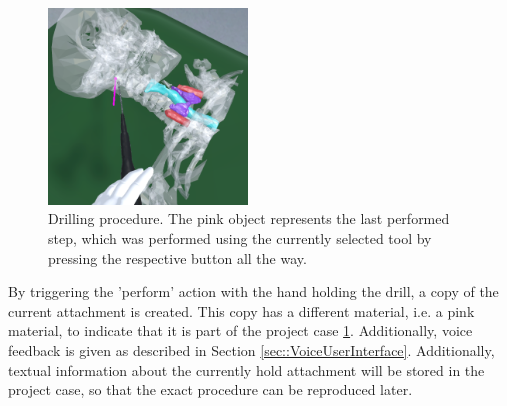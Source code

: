 \begin{figure}[ht]
    \centering
    \includegraphics[width=200px]{images/implementation/features/procedures/drilling.png}
    \caption{\label{fig::FeatureDrilling}Drilling procedure. The pink object represents the last performed step, which was performed using the currently selected tool by pressing the respective button all the way.}
\end{figure}

By triggering the 'perform' action with the hand holding the drill, a copy of the current attachment is created. 
This copy has a different material, i.e. a pink material, to indicate that it is part of the project case \ref{fig::FeatureDrilling}.
Additionally, voice feedback is given as described in Section \ref{sec::VoiceUserInterface}.
Additionally, textual information about the currently hold attachment will be stored in the project case, so that the exact procedure can be reproduced later.